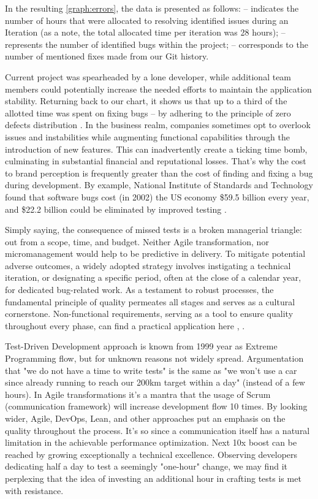 In the resulting \cref{graph:errors}, the data is presented as follows:
 -- indicates the number of hours that were allocated to resolving identified issues during an Iteration (as a 
note, the total allocated time per iteration was 28 hours);
 -- represents the number of identified bugs within the project;
 -- corresponds to the number of mentioned fixes made from our Git history.

Current project was spearheaded by a lone developer, while additional team members could potentially increase 
the needed efforts \cite{Alm21} to maintain the application stability. Returning back to our chart, it shows us 
that up to a third of the allotted time was spent on fixing bugs -- by adhering to the principle of zero 
defects distribution \cite{Allan98}. In the business realm, companies sometimes opt to overlook issues and instabilities 
while augmenting functional capabilities through the introduction of new features. This can inadvertently create a ticking 
time bomb, culminating in substantial financial and reputational losses. That's why the cost to brand perception is 
frequently greater than the cost of finding and fixing a bug during development. By example, National Institute of 
Standards and Technology found that software bugs cost (in 2002) the US economy \$59.5 billion every year, and 
\$22.2 billion could be eliminated by improved testing \cite{RTI02}.

Simply saying, the consequence of missed tests is a broken managerial triangle: out from a scope, time, and budget.
Neither Agile transformation, nor micromanagement would help to be predictive in delivery. To mitigate potential adverse 
outcomes, a widely adopted strategy involves instigating a technical iteration, or designating a specific period, often 
at the close of a calendar year, for dedicated bug-related work. As a testament to robust processes, the fundamental 
principle of quality permeates all stages and serves as a cultural cornerstone. Non-functional requirements, serving 
as a tool to ensure quality throughout every phase, can find a practical application here \cite{Sam17}, \cite{Suz12}. 

Test-Driven Development approach is known from 1999 year as Extreme Programming flow, but for unknown reasons 
not widely spread. Argumentation that "we do not have a time to write tests" is the same as "we won't use a car since 
already running to reach our 200km target within a day" (instead of a few hours). In Agile transformations it's a mantra 
that the usage of Scrum (communication framework) will increase development flow 10 times. By looking wider, 
Agile, DevOps, Lean, and other approaches put an emphasis on the quality throughout the process. It's so since a 
communication itself has a natural limitation in the achievable performance optimization. Next 10x boost can be reached 
by growing exceptionally a technical excellence. Observing developers dedicating half a day to test a seemingly 
"one-hour" change, we may find it perplexing that the idea of investing an additional hour in crafting tests is met with 
resistance.

